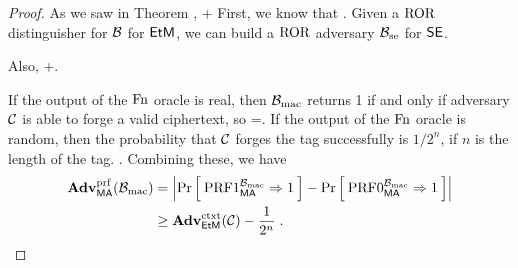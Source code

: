 \begin{proof}
	As we saw in Theorem ,
	\bnm
	\AdvRORCCA{\EtM}{\advA}\leq \AdvROR{\EtM}{\advB} + \AdvCTXT{\EtM}{\advC}
	\enm
	First, we know that 
	\bnm
	\AdvROR{\EtM}{\advB} \leq {}\;.
	\enm
	Given a $\textnormal{ROR}$ distinguisher for ${\mathcal B}$ for $\mathsf{EtM}$, we can build a $\textnormal{ROR}$ adversary ${\mathcal B}_\textrm{se}$ for ${\mathsf{SE}}$. 
	
	Also,
	\bnm
	\AdvCTXT{\EtM}{\advC} \leq {}+\;.
	\enm
	
	If the output of the $\textnormal{Fn}$ oracle is real, then ${\mathcal B}_{\textrm{mac}}$ returns 1 if and only if adversary ${\mathcal C}$ is able to forge a valid ciphertext, so
	\bnm
	=\Prob{\CTXT_{\EtM}^{\advC}}\;.
	\enm
	If the output of the $\textnormal{Fn}$ oracle is random, then the probability that ${\mathcal C}$ forges the tag successfully is $1/2^n$, if $n$ is the length of the tag. 
	\bnm
	\leq {}\;.
	\enm
	Combining these, we have
	\begin{align*}
	\mathbf{Adv}^{\mathrm{prf}}_{\mathsf{MA}}({\mathcal B}_{\textrm{mac}})&=\left|\Pr\left[\: \textnormal{PRF}1_{\mathsf{MA}}^{{\mathcal B}_{\textrm{mac}}}\Rightarrow 1 \:\right]-\Pr\left[\: \textnormal{PRF}0_{\mathsf{MA}}^{{\mathcal B}_{\textrm{mac}}}\Rightarrow 1 \:\right]\right|\\
	&\geq \mathbf{Adv}^{\mathrm{ctxt}}_{\mathsf{EtM}}({\mathcal C})-\frac{1}{2^n}\;.
	\end{align*}
\end{proof}